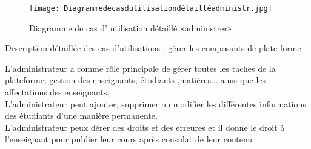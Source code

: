 \begin{figure}[ht]
	\centering
	\texttt{[image: Diagrammedecasdutilisationdétailléadministr.jpg]}
	\caption{Diagramme de cas d' utilisation  détaillé «administrer» .}
	\label{fig:Diagramme de cas d' utilisation  détaillé administrer  }
\end{figure}
\FloatBarrier
\clearpage
{\Large \color{cyan} Description détaillée des cas d’utilisations : gérer les composants de plate-forme}

L'administrateur a comme rôle principale de gérer toutes les taches de la plateforme; gestion des enseignants, étudiants ,matières....ainsi que les affectations des
enseignants.\\
L'administrateur peut ajouter, supprimer ou modifier les différentes informations des étudiants d'une manière permanente.\\
L'administrateur peux dérer des droits et des erreures et il donne le droit à l'enseignant pour publier leur cours après  consulat  de leur contenu .
